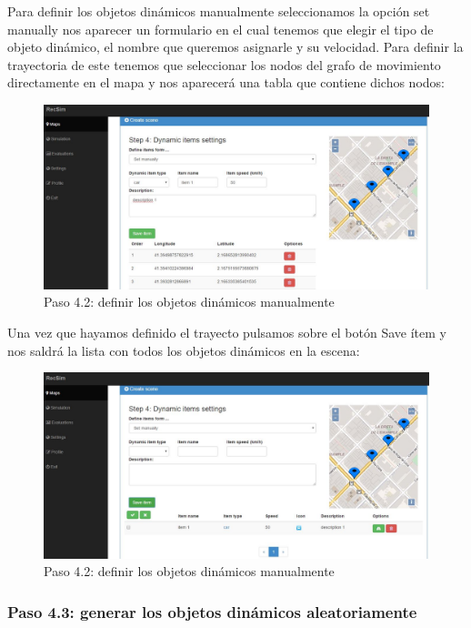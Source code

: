 Para definir los objetos dinámicos manualmente seleccionamos la opción set manually nos aparecer un formulario en el cual tenemos que elegir el tipo de objeto dinámico, el nombre que queremos asignarle y su velocidad. Para definir la trayectoria de este tenemos que seleccionar los nodos del grafo de movimiento directamente en el mapa y nos aparecerá una tabla que contiene dichos nodos:

\begin{figure}[H]
	\centering\includegraphics[scale=0.35]{imagenes/capitulo9/crear-escena-6.JPG}
	\caption{Paso 4.2: definir los objetos dinámicos manualmente}
	\label{img:paso4-2-1}
\end{figure}

Una vez que hayamos definido el trayecto pulsamos sobre el botón Save ítem y nos saldrá la lista con todos los objetos dinámicos en la escena:

\begin{figure}[H]
	\centering\includegraphics[scale=0.35]{imagenes/capitulo9/crear-escena-7.JPG}
	\caption{Paso 4.2: definir los objetos dinámicos manualmente}
	\label{img:paso4-2-2}
\end{figure}

\subsubsection{Paso 4.3: generar los objetos dinámicos aleatoriamente}

